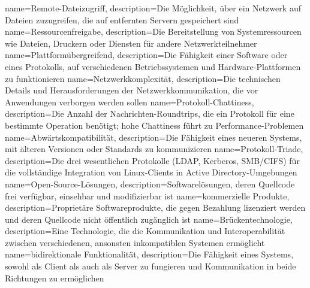 {
	name={Re\-mo\-te-Da\-tei\-zu\-griff},
	description={Die Mög\-lich\-keit, über ein Netz\-werk auf Da\-tei\-en zu\-zu\-grei\-fen, die auf ent\-fern\-ten Ser\-vern ge\-spei\-chert sind}
}
{
	name={Res\-sour\-cen\-frei\-ga\-be},
	description={Die Be\-reit\-stel\-lung von Sys\-tem\-res\-sour\-cen wie Da\-tei\-en, Dru\-ckern oder Diens\-ten für an\-de\-re Netz\-werk\-teil\-neh\-mer}
}
{
	name={Platt\-form\-über\-grei\-fend},
	description={Die Fä\-hig\-keit ei\-ner Soft\-ware oder ei\-nes Pro\-to\-kolls, auf ver\-schie\-de\-nen Be\-triebs\-sys\-te\-men und Hard\-ware-Platt\-for\-men zu funk\-tio\-nie\-ren}
}
{
	name={Netz\-werk\-kom\-ple\-xi\-tät},
	description={Die tech\-ni\-schen De\-tails und Her\-aus\-for\-de\-run\-gen der Netz\-werk\-kom\-mu\-ni\-ka\-ti\-on, die vor An\-wen\-dun\-gen ver\-bor\-gen wer\-den sol\-len}
}
{
	name={Pro\-to\-koll-Chat\-ti\-ness},
	description={Die An\-zahl der Nach\-rich\-ten-Round\-trips, die ein Pro\-to\-koll für eine be\-stimm\-te Ope\-ra\-ti\-on be\-nö\-tigt; hohe Chat\-ti\-ness führt zu Per\-for\-mance-Pro\-ble\-men}
}
{
	name={Ab\-wärts\-kom\-pa\-ti\-bi\-li\-tät},
	description={Die Fä\-hig\-keit ei\-nes neu\-e\-ren Sys\-tems, mit äl\-te\-ren Ver\-sio\-nen oder Stan\-dards zu kom\-mu\-ni\-zie\-ren}
}
{
	name={Pro\-to\-koll-Tria\-de},
	description={Die drei we\-sent\-li\-chen Pro\-to\-kol\-le (LDAP, Ker\-be\-ros, SMB/CIFS) für die voll\-stän\-di\-ge In\-te\-gra\-ti\-on von Li\-nux-Cli\-ents in Ac\-tive Di\-rec\-to\-ry-Um\-ge\-bun\-gen}
}
{
	name={Open-Source-Lö\-sun\-gen},
	description={Soft\-ware\-lö\-sun\-gen, de\-ren Quell\-code frei ver\-füg\-bar, ein\-seh\-bar und mo\-di\-fi\-zier\-bar ist}
}
{
	name={kom\-mer\-zi\-el\-le Pro\-duk\-te},
	description={Pro\-prie\-tä\-re Soft\-ware\-pro\-duk\-te, die ge\-gen Be\-zah\-lung li\-zen\-ziert wer\-den und de\-ren Quell\-code nicht öf\-fent\-lich zu\-gäng\-lich ist}
}
{
	name={Brü\-cken\-tech\-no\-lo\-gie},
	description={Eine Tech\-no\-lo\-gie, die die Kom\-mu\-ni\-ka\-ti\-on und In\-ter\-ope\-ra\-bi\-li\-tät zwi\-schen ver\-schie\-de\-nen, an\-sons\-ten in\-kom\-pa\-ti\-blen Sys\-te\-men er\-mög\-licht}
}
{
	name={bi\-di\-rek\-tio\-na\-le Funk\-tio\-na\-li\-tät},
	description={Die Fä\-hig\-keit ei\-nes Sys\-tems, so\-wohl als Cli\-ent als auch als Ser\-ver zu fun\-gie\-ren und Kom\-mu\-ni\-ka\-ti\-on in bei\-de Rich\-tun\-gen zu er\-mög\-li\-chen}
}
